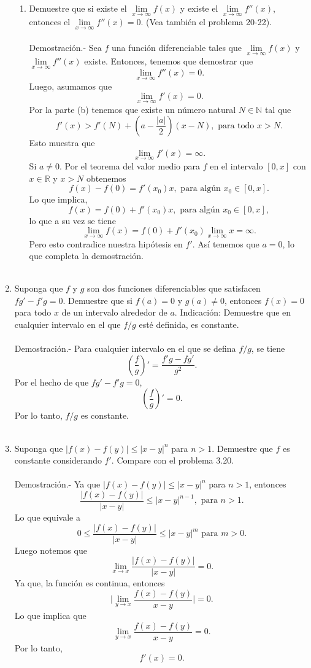 \begin{enumerate}[\bfseries 1.]
\begin{enumerate}
	    \item Demuestre que si existe el $\lim\limits_{x\to \infty}f(x)$ y existe el $\lim\limits_{x\to \infty} f''(x)$, entonces el $\lim\limits_{x\to \infty}f''(x)=0$. (Vea también el problema 20-22).\\\\
		Demostración.-\; Sea $f$ una función diferenciable tales que $\lim\limits_{x\to \infty}f(x)$ y $\lim\limits_{x\to \infty}f''(x)$ existe. Entonces, tenemos que demostrar que
		$$\lim_{x\to \infty}f''(x)=0.$$
		Luego, asumamos que
		$$\lim_{x\to \infty}f'(x)=0.$$
		Por la parte (b) tenemos que existe un número natural $N\in \mathbb{N}$ tal que 
		$$f'(x)>f'(N)+\left(a-\dfrac{|a|}{2}\right)(x-N), \mbox{ para todo }x>N.$$
		Esto muestra que
		$$\lim_{x\to \infty}f'(x)=\infty.$$
		Si $a\neq 0$. Por el teorema del valor medio para $f$ en el intervalo $[0,x]$ con $x\in \mathbb{R}$ y $x>N$ obtenemos
		$$f(x)-f(0)=f'(x_0)x,\mbox{ para algún }x_0\in[0,x].$$
		Lo que implica,
		$$f(x)=f(0)+f'(x_0)x,\mbox{ para algún }x_0\in[0,x],$$
		lo que a su vez se tiene
		$$\lim_{x\to \infty}f(x)=f(0)+f'(x_0)\lim_{x\to \infty}x=\infty.$$
		Pero esto contradice nuestra hipótesis en $f'$. Así tenemos que $a=0$, lo que completa la demostración.\\\\

	\end{enumerate}

    \item Suponga que $f$ y $g$ son dos funciones diferenciables que satisfacen $fg'-f'g=0$. Demuestre que si $f(a)=0$ y $g(a)\neq 0$, entonces $f(x)=0$ para todo $x$ de un intervalo alrededor de $a$. Indicación: Demuestre que en cualquier intervalo en el que $f/g$ esté definida, es constante.\\\\
	Demostración.-\; Para cualquier intervalo en el que se defina $f/g$, se tiene
	$$\left(\dfrac{f}{g}\right)'=\dfrac{f'g-fg'}{g^2}.$$
	Por el hecho de que $fg'-f'g=0$, 
	$$\left(\dfrac{f}{g}\right)'=0.$$
	Por lo tanto, $f/g$ es constante.\\\\

    \item Suponga que $|f(x)-f(y)|\leq |x-y|^n$ para $n>1$. Demuestre que $f$ es constante considerando $f'$. Compare con el problema 3.20.\\\\
	Demostración.-\; Ya que $|f(x)-f(y)|\leq |x-y|^n$ para $n>1$, entonces
	$$\dfrac{|f(x)-f(y)|}{|x-y|}\leq |x-y|^{n-1},\mbox{ para } n>1.$$
	Lo que equivale a
	$$0\leq \dfrac{|f(x)-f(y)|}{|x-y|}\leq |x-y|^m \mbox{ para }m>0.$$
	Luego notemos que
	$$\lim_{x\to x}\dfrac{|f(x)-f(y)|}{|x-y|}=0.$$
	Ya que, la función es continua, entonces
	$$\bigg|\lim_{y\to x}\dfrac{f(x)-f(y)}{x-y}\bigg|=0.$$
	Lo que implica que 
	$$\lim_{y\to x}\dfrac{f(x)-f(y)}{x-y}=0.$$
	Por lo tanto,
	$$f'(x)=0.$$\\


\end{enumerate}
